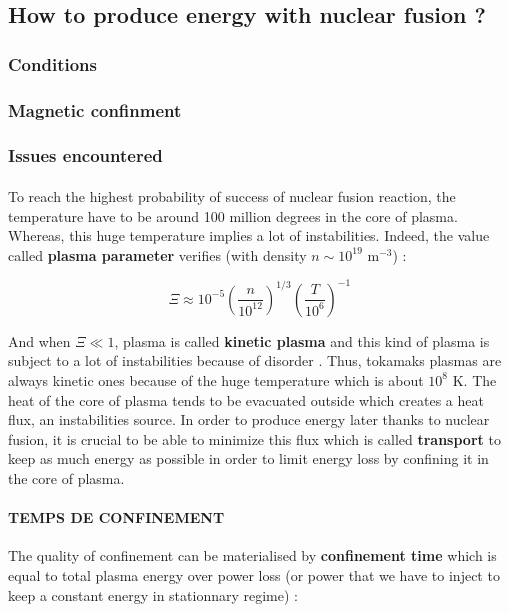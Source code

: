 \documentclass[12pt]{article}
\begin{document}
\subsection{How to produce energy with nuclear fusion ?}

\subsubsection{Conditions}

\subsubsection{Magnetic confinment}

\subsubsection{Issues encountered}

\paragraph{}
To reach the highest probability of success of nuclear fusion reaction, the temperature have to be around 100 million degrees in the core of plasma. Whereas, this huge temperature implies a lot of instabilities. Indeed, the value called \textbf{plasma parameter} verifies (with density \(n \sim 10^{19} \textrm{ m}^{-3}\)) : 

\begin{equation}
    \Xi \approx 10^{-5} \left (\frac{n}{10^{12}}\right)^{1/3} \left(\frac{T}{10^6}\right)^{-1}
\end{equation}

And when \(\Xi \ll 1\), plasma is called \textbf{kinetic plasma} and this kind of plasma is subject to a lot of instabilities because of disorder \cite{antoine_strugarek_turubulence_2012}. Thus, tokamaks plasmas are always kinetic ones because of the huge temperature which is about \(10^8\) K. The heat of the core of plasma tends to be evacuated outside which creates a heat flux, an instabilities source. In order to produce energy later thanks to nuclear fusion, it is crucial to be able to minimize this flux which is called \textbf{transport} to keep as much energy as possible in order to limit energy loss by confining it in the core of plasma. 

\paragraph{TEMPS DE CONFINEMENT}
The quality of confinement can be materialised by \textbf{confinement time} which is equal to total plasma energy over power loss (or power that we have to inject to keep a constant energy in stationnary regime) :
\end{document}
